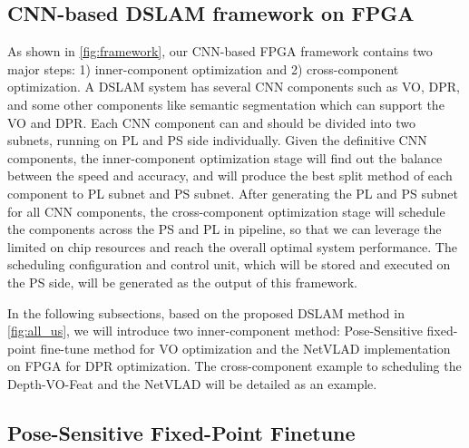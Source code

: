 \subsection {CNN-based DSLAM framework on FPGA}
As shown in \cref{fig:framework}, our CNN-based FPGA framework contains two major steps: 1) inner-component optimization and 2) cross-component optimization. A DSLAM system has several CNN components such as VO, DPR, and some other components like semantic segmentation which can support the VO and DPR. Each CNN component can and should be divided into two subnets, running on PL and PS side individually. Given the definitive  CNN components, the inner-component optimization stage will find out the balance between the speed and accuracy, and will produce the best split method of each component to PL subnet and PS subnet. After generating the PL and PS subnet for all CNN components, the cross-component optimization stage will schedule the components across the PS and PL in pipeline, so that we can leverage the limited on chip resources and reach the overall optimal system performance. The scheduling configuration and control unit, which will be stored and executed on the PS side, will be generated as the  output of this framework.

In the following subsections, based on the proposed DSLAM method in \cref{fig:all_us}, we will introduce two inner-component method: Pose-Sensitive fixed-point fine-tune method for VO optimization and the NetVLAD  implementation on FPGA for DPR optimization. The cross-component example to scheduling the Depth-VO-Feat and the NetVLAD will be detailed as an example.


\subsection{Pose-Sensitive Fixed-Point Finetune}


